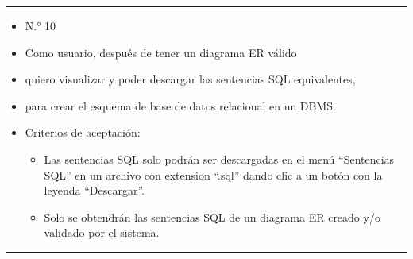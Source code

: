\noindent\rule{\textwidth}{1pt}
\begin{itemize}
	\item N.° 10
	\item Como usuario, después de tener un diagrama ER válido
	\item quiero visualizar y poder descargar las sentencias SQL equivalentes,
	\item para crear el esquema de base de datos relacional en un DBMS.
	\item Criterios de aceptación:
	\begin{itemize}
		\item Las sentencias SQL solo podrán ser descargadas en el menú ``Sentencias SQL'' en un archivo con extension ``.sql'' dando clic a un botón con la leyenda ``Descargar''.
		\item Solo se obtendrán las sentencias SQL de un diagrama ER creado y/o validado por el sistema.
	\end{itemize}
\end{itemize}
\noindent\rule{\textwidth}{1pt}
